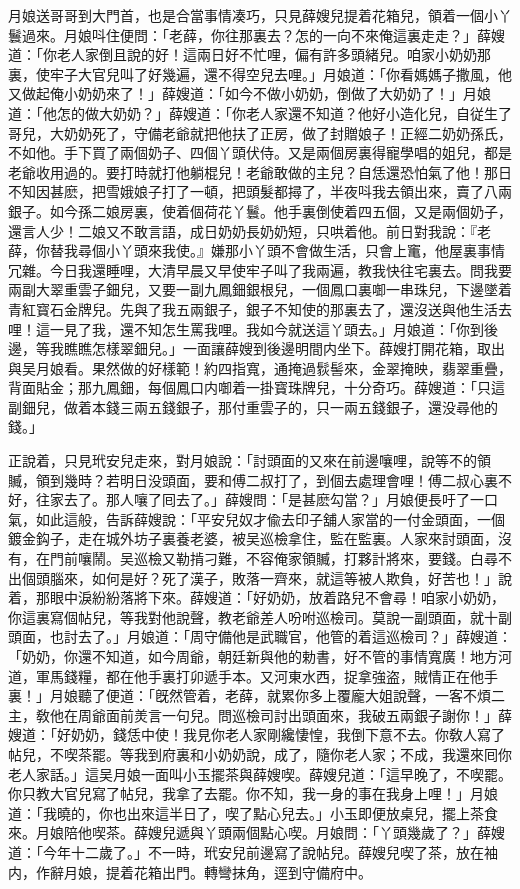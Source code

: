 月娘送哥哥到大門首，也是合當事情凑巧，只見薛嫂兒提着花箱兒，領着一個小丫鬟過來。月娘呌住便問：「老薛，你往那裏去？怎的一向不來俺這裏走走？」薛嫂道：「你老人家倒且說的好！這兩日好不忙哩，偏有許多頭緒兒。咱家小奶奶那裏，使牢子大官兒叫了好幾遍，還不得空兒去哩。」月娘道：「你看媽媽子撒風，他又做起俺小奶奶來了！」薛嫂道：「如今不做小奶奶，倒做了大奶奶了！」月娘道：「他怎的做大奶奶？」薛嫂道：「你老人家還不知道？他好小造化兒，自従生了哥兒，大奶奶死了，守備老爺就把他扶了正房，做了封贈娘子！正經二奶奶孫氏，不如他。手下買了兩個奶子、四個丫頭伏侍。又是兩個房裏得寵學唱的姐兒，都是老爺收用過的。要打時就打他躺棍兒！老爺敢做的主兒？自恁還恐怕氣了他！那日不知因甚麽，把雪娥娘子打了一頓，把頭髮都撏了，半夜呌我去領出來，賣了八兩銀子。如今孫二娘房裏，使着個荷花丫鬟。他手裏倒使着四五個，又是兩個奶子，還言人少！二娘又不敢言語，成日奶奶長奶奶短，只哄着他。前日對我說：『老薛，你替我尋個小丫頭來我使。』嫌那小丫頭不會做生活，只會上竃，他屋裏事情冗雜。今日我還睡哩，大清早晨又早使牢子叫了我兩遍，教我快往宅裏去。問我要兩副大翠重雲子鈿兒，又要一副九鳳鈿銀根兒，一個鳳口裏啣一串珠兒，下邊墜着青紅寳石金牌兒。先與了我五兩銀子，銀子不知使的那裏去了，還沒送與他生活去哩！這一見了我，還不知怎生罵我哩。我如今就送這丫頭去。」月娘道：「你到後邊，等我瞧瞧怎樣翠鈿兒。」一面讓薛嫂到後邊明間内坐下。薛嫂打開花箱，取出與吴月娘看。果然做的好樣範！約四指寬，通掩過䯼髻來，金翠掩映，翡翠重疊，背面貼金；那九鳳鈿，每個鳳口内啣着一掛寳珠牌兒，十分奇巧。薛嫂道：「只這副鈿兒，做着本錢三兩五錢銀子，那付重雲子的，只一兩五錢銀子，還没尋他的錢。」

正說着，只見玳安兒走來，對月娘說：「討頭面的又來在前邊嚷哩，說等不的領贓，領到幾時？若明日没頭面，要和傅二叔打了，到個去處理會哩！傅二叔心裏不好，往家去了。那人嚷了囘去了。」薛嫂問：「是甚麽勾當？」月娘便長吁了一口氣，如此這般，告訴薛嫂說：「平安兒奴才偸去印子舖人家當的一付金頭面，一個鍍金鈎子，走在城外坊子裏養老婆，被吴巡檢拿住，監在監裏。人家來討頭面，沒有，在門前嚷鬧。吴巡檢又勒掯刁難，不容俺家領贓，打夥計將來，要錢。白尋不出個頭腦來，如何是好？死了漢子，敗落一齊來，就這等被人欺負，好苦也！」說着，那眼中淚紛紛落將下來。薛嫂道：「好奶奶，放着路兒不會尋！咱家小奶奶，你這裏寫個帖兒，等我對他說聲，教老爺差人吩咐巡檢司。莫說一副頭面，就十副頭面，也討去了。」月娘道：「周守備他是武職官，他管的着這巡檢司？」薛嫂道：「奶奶，你還不知道，如今周爺，朝廷新與他的勅書，好不管的事情寬廣！地方河道，軍馬錢糧，都在他手裏打卯遞手本。又河東水西，捉拿強盗，賊情正在他手裏！」月娘聽了便道：「旣然管着，老薛，就累你多上覆龐大姐說聲，一客不煩二主，敎他在周爺面前羙言一句兒。問巡檢司討出頭面來，我破五兩銀子謝你！」薛嫂道：「好奶奶，錢恁中使！我見你老人家剛纔悽惶，我倒下意不去。你敎人寫了帖兒，不喫茶罷。等我到府裏和小奶奶說，成了，隨你老人家；不成，我還來囘你老人家話。」這吴月娘一面叫小玉擺茶與薛嫂喫。薛嫂兒道：「這早晚了，不喫罷。你只教大官兒寫了帖兒，我拿了去罷。你不知，我一身的事在我身上哩！」月娘道：「我曉的，你也出來這半日了，喫了點心兒去。」小玉即便放桌兒，擺上茶食來。月娘陪他喫茶。薛嫂兒遞與丫頭兩個點心喫。月娘問：「丫頭幾歲了？」薛嫂道：「今年十二歲了。」不一時，玳安兒前邊寫了說帖兒。薛嫂兒喫了茶，放在袖内，作辭月娘，提着花箱出門。轉彎抹角，逕到守備府中。

